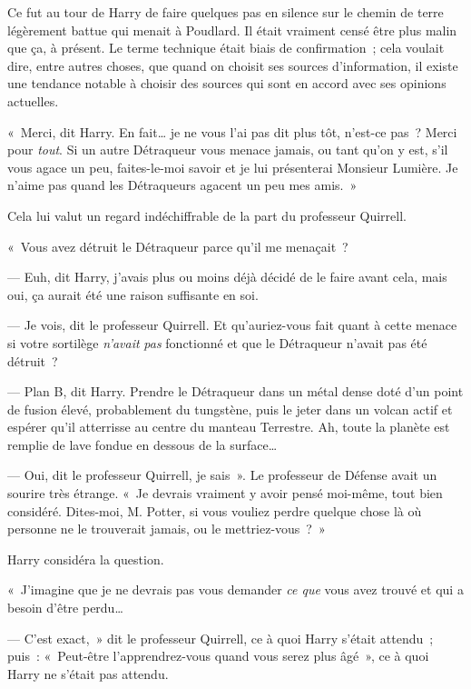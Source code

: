 Ce fut au tour de Harry de faire quelques pas en silence sur le chemin de terre légèrement battue qui menait à Poudlard. Il était vraiment censé être plus malin que ça, à présent. Le terme technique était biais de confirmation~; cela voulait dire, entre autres choses, que quand on choisit ses sources d'information, il existe une tendance notable à choisir des sources qui sont en accord avec ses opinions actuelles.

«~Merci, dit Harry. En fait… je ne vous l'ai pas dit plus tôt, n'est-ce pas~? Merci pour \emph{tout}. Si un autre Détraqueur vous menace jamais, ou tant qu'on y est, s'il vous agace un peu, faites-le-moi savoir et je lui présenterai Monsieur Lumière. Je n'aime pas quand les Détraqueurs agacent un peu mes amis.~»

Cela lui valut un regard indéchiffrable de la part du professeur Quirrell.

«~Vous avez détruit le Détraqueur parce qu'il me menaçait~?

--- Euh, dit Harry, j'avais plus ou moins déjà décidé de le faire avant cela, mais oui, ça aurait été une raison suffisante en soi.

--- Je vois, dit le professeur Quirrell. Et qu'auriez-vous fait quant à cette menace si votre sortilège \emph{n'avait} \emph{pas} fonctionné et que le Détraqueur n'avait pas été détruit~?

--- Plan B, dit Harry. Prendre le Détraqueur dans un métal dense doté d'un point de fusion élevé, probablement du tungstène, puis le jeter dans un volcan actif et espérer qu'il atterrisse au centre du manteau Terrestre. Ah, toute la planète est remplie de lave fondue en dessous de la surface…

--- Oui, dit le professeur Quirrell, je sais~». Le professeur de Défense avait un sourire très étrange. «~Je devrais vraiment y avoir pensé moi-même, tout bien considéré. Dites-moi, M. Potter, si vous vouliez perdre quelque chose là où personne ne le trouverait jamais, ou le mettriez-vous~?~»

Harry considéra la question.

«~J'imagine que je ne devrais pas vous demander \emph{ce que} vous avez trouvé et qui a besoin d'être perdu…

--- C'est exact,~» dit le professeur Quirrell, ce à quoi Harry s'était attendu~; puis~: «~Peut-être l'apprendrez-vous quand vous serez plus âgé~», ce à quoi Harry ne s'était pas attendu.

